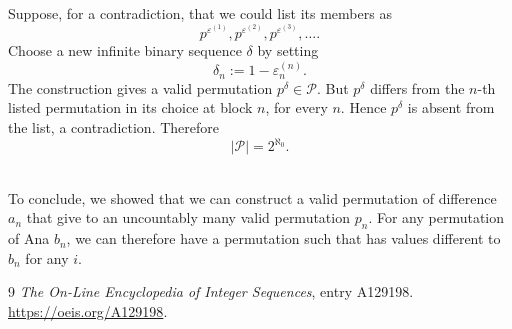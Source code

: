 \documentclass[11pt,a4paper]{article}
\newtheorem{theorem}{Theorem}[section]
\theoremstyle{definition}
\theoremstyle{remark}
\numberwithin{equation}{section}
\newcommand{\R}{\mathbb{R}}
\begin{document}
Suppose, for a contradiction, that we could list its members as
\[
p^{\varepsilon^{(1)}},
p^{\varepsilon^{(2)}},
p^{\varepsilon^{(3)}},\ldots.
\]
Choose a new infinite binary sequence \(\delta\) by setting
\[
\delta_n:=1-\varepsilon^{(n)}_n.
\]
The construction gives a valid permutation \(p^\delta\in\mathcal P\). But \(p^\delta\) differs from the \(n\)-th listed permutation in its choice at block \(n\), for every \(n\). Hence \(p^\delta\) is absent from the list, a contradiction.
Therefore
\[
|\mathcal P|=2^{\aleph_0}.
\]


\\
To conclude, we showed that we can construct a valid permutation of difference $a_n$ that give to an uncountably many valid permutation $p_n$. For any permutation of Ana $b_n$, we can therefore have a permutation such that has values different to $b_n$ for any $i$.



\begin{thebibliography}{9}
\emph{The On-Line Encyclopedia of Integer Sequences}, entry A129198.
\url{https://oeis.org/A129198}.
\end{thebibliography}
\end{document}
